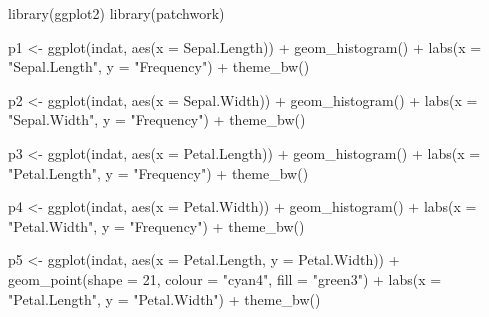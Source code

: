 \documentclass[
  letterpaper,
  DIV=11,
  numbers=noendperiod]{scrartcl}
\newenvironment{Shaded}{\begin{snugshade}}{\end{snugshade}}
\newcommand{\AttributeTok}[1]{\textcolor[rgb]{0.40,0.45,0.13}{#1}}
\newcommand{\DecValTok}[1]{\textcolor[rgb]{0.68,0.00,0.00}{#1}}
\newcommand{\FunctionTok}[1]{\textcolor[rgb]{0.28,0.35,0.67}{#1}}
\newcommand{\NormalTok}[1]{\textcolor[rgb]{0.00,0.23,0.31}{#1}}
\newcommand{\OtherTok}[1]{\textcolor[rgb]{0.00,0.23,0.31}{#1}}
\newcommand{\SpecialCharTok}[1]{\textcolor[rgb]{0.37,0.37,0.37}{#1}}
\newcommand{\StringTok}[1]{\textcolor[rgb]{0.13,0.47,0.30}{#1}}
\begin{document}
\begin{Shaded}
\begin{Highlighting}[]
\FunctionTok{library}\NormalTok{(ggplot2)}
\FunctionTok{library}\NormalTok{(patchwork)}

\NormalTok{p1 }\OtherTok{\textless{}{-}} \FunctionTok{ggplot}\NormalTok{(indat, }\FunctionTok{aes}\NormalTok{(}\AttributeTok{x =}\NormalTok{ Sepal.Length)) }\SpecialCharTok{+}
  \FunctionTok{geom\_histogram}\NormalTok{() }\SpecialCharTok{+}
  \FunctionTok{labs}\NormalTok{(}\AttributeTok{x =} \StringTok{"Sepal.Length"}\NormalTok{, }\AttributeTok{y =} \StringTok{"Frequency"}\NormalTok{) }\SpecialCharTok{+}
  \FunctionTok{theme\_bw}\NormalTok{()}

\NormalTok{p2 }\OtherTok{\textless{}{-}} \FunctionTok{ggplot}\NormalTok{(indat, }\FunctionTok{aes}\NormalTok{(}\AttributeTok{x =}\NormalTok{ Sepal.Width)) }\SpecialCharTok{+}
  \FunctionTok{geom\_histogram}\NormalTok{() }\SpecialCharTok{+}
  \FunctionTok{labs}\NormalTok{(}\AttributeTok{x =} \StringTok{"Sepal.Width"}\NormalTok{, }\AttributeTok{y =} \StringTok{"Frequency"}\NormalTok{) }\SpecialCharTok{+}
  \FunctionTok{theme\_bw}\NormalTok{()}

\NormalTok{p3 }\OtherTok{\textless{}{-}} \FunctionTok{ggplot}\NormalTok{(indat, }\FunctionTok{aes}\NormalTok{(}\AttributeTok{x =}\NormalTok{ Petal.Length)) }\SpecialCharTok{+}
  \FunctionTok{geom\_histogram}\NormalTok{() }\SpecialCharTok{+}
  \FunctionTok{labs}\NormalTok{(}\AttributeTok{x =} \StringTok{"Petal.Length"}\NormalTok{, }\AttributeTok{y =} \StringTok{"Frequency"}\NormalTok{) }\SpecialCharTok{+}
  \FunctionTok{theme\_bw}\NormalTok{()}

\NormalTok{p4 }\OtherTok{\textless{}{-}} \FunctionTok{ggplot}\NormalTok{(indat, }\FunctionTok{aes}\NormalTok{(}\AttributeTok{x =}\NormalTok{ Petal.Width)) }\SpecialCharTok{+}
  \FunctionTok{geom\_histogram}\NormalTok{() }\SpecialCharTok{+}
  \FunctionTok{labs}\NormalTok{(}\AttributeTok{x =} \StringTok{"Petal.Width"}\NormalTok{, }\AttributeTok{y =} \StringTok{"Frequency"}\NormalTok{) }\SpecialCharTok{+}
  \FunctionTok{theme\_bw}\NormalTok{()}

\NormalTok{p5 }\OtherTok{\textless{}{-}} \FunctionTok{ggplot}\NormalTok{(indat, }\FunctionTok{aes}\NormalTok{(}\AttributeTok{x =}\NormalTok{ Petal.Length, }\AttributeTok{y =}\NormalTok{ Petal.Width)) }\SpecialCharTok{+}
  \FunctionTok{geom\_point}\NormalTok{(}\AttributeTok{shape =} \DecValTok{21}\NormalTok{, }\AttributeTok{colour =} \StringTok{"cyan4"}\NormalTok{, }\AttributeTok{fill =} \StringTok{"green3"}\NormalTok{) }\SpecialCharTok{+}
  \FunctionTok{labs}\NormalTok{(}\AttributeTok{x =} \StringTok{"Petal.Length"}\NormalTok{, }\AttributeTok{y =} \StringTok{"Petal.Width"}\NormalTok{) }\SpecialCharTok{+}
  \FunctionTok{theme\_bw}\NormalTok{()}


\end{Highlighting}
\end{Shaded}
\end{document}
